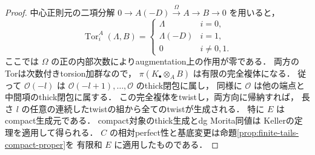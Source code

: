 \begin{proof}
中心正則元の二項分解
$0\to A(-D)\xrightarrow{\Omega}A\to B\to0$ を用いると，
\[
 \operatorname{Tor}^A_i(\Lambda,B)=
 \begin{cases}
 \Lambda&i=0,\\
 \Lambda(-D)&i=1,\\
 0&i\ne0,1.
 \end{cases}
\]
ここでは $\Omega$ の正の内部次数によりaugmentation上の作用が零である．
両方のTorは次数付きtorsion加群なので，
$\pi(K_\bullet\otimes_A B)$ は有限の完全複体になる．
従って $\mathcal O(-l)$ は
$\mathcal O(-l+1),\ldots,\mathcal O$ のthick閉包に属し，
同様に $\mathcal O$ は他の端点と中間項のthick閉包に属する．
この完全複体をtwistし，両方向に帰納すれば，
長さ $l$ の任意の連続したtwistの組から全てのtwistが生成される．
特に $E$ はcompact生成元である．
compact対象のthick生成とdg Morita同値は
Kellerの定理\cite[\S4.3,\S8.2]{Keller1994}を適用して得られる．
$C$ の相対perfect性と基底変更は命題\ref{prop:finite-tails-compact-proper}を
有限和 $E$ に適用したものである．

\end{proof}

